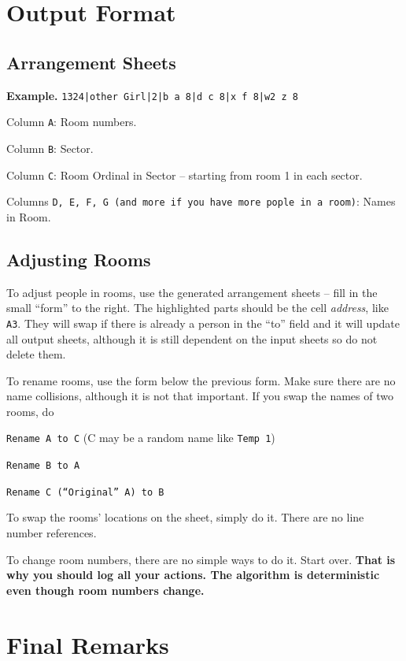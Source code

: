 \documentclass[openany,notitlepage]{book}
\begin{document}
	\section{Output Format}
	\subsection{Arrangement Sheets}
	\textbf{Example.} \texttt{1324|other Girl|2|b a 8|d c 8|x f 8|w2 z 8}
	
	Column \verb|A|: Room numbers.
	
	Column \verb|B|: Sector.
	
	Column \verb|C|: Room Ordinal in Sector -- starting from room 1 in each sector. 
	
	Columns \verb|D, E, F, G (and more if you have more pople in a room)|: Names in Room.
	
	\subsection{Adjusting Rooms}
	
	To adjust people in rooms, use the generated arrangement sheets  -- fill in the small ``form'' to the right. The highlighted
	parts should be the cell \emph{address}, like \verb|A3|. They will swap if there is already a person in the ``to'' field and it
	will update all output sheets, although it is still dependent on the input sheets so do not delete them.
	
	To rename rooms, use the form below the previous form. Make sure there are no name collisions, although it is not that
	important. If you swap the names of two rooms, do
	\begin{center}
		\texttt{Rename A to C} (C may be a random name like \texttt{Temp 1})
		
		\texttt{Rename B to A}
		
		\texttt{Rename C (``Original'' A) to B}
	\end{center}
	
	To swap the rooms' locations on the sheet, simply do it. There are no line number references.
	
	To change room numbers, there are no simple ways to do it. Start over. \textbf{That is why you should log all your actions. The algorithm is deterministic even though room numbers change.}
	
	\section{Final Remarks}
	
\end{document}
